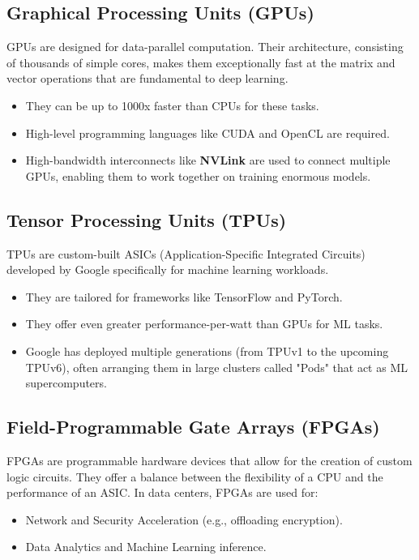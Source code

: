 \subsection{Graphical Processing Units (GPUs)}
GPUs are designed for data-parallel computation. Their architecture, consisting of thousands of simple cores, makes them exceptionally fast at the matrix and vector operations that are fundamental to deep learning.
\begin{itemize}
    \item They can be up to 1000x faster than CPUs for these tasks.
    \item High-level programming languages like CUDA and OpenCL are required.
    \item High-bandwidth interconnects like \textbf{NVLink} are used to connect multiple GPUs, enabling them to work together on training enormous models.
\end{itemize}

\subsection{Tensor Processing Units (TPUs)}
TPUs are custom-built ASICs (Application-Specific Integrated Circuits) developed by Google specifically for machine learning workloads.
\begin{itemize}
    \item They are tailored for frameworks like TensorFlow and PyTorch.
    \item They offer even greater performance-per-watt than GPUs for ML tasks.
    \item Google has deployed multiple generations (from TPUv1 to the upcoming TPUv6), often arranging them in large clusters called "Pods" that act as ML supercomputers.
\end{itemize}

\subsection{Field-Programmable Gate Arrays (FPGAs)}
FPGAs are programmable hardware devices that allow for the creation of custom logic circuits. They offer a balance between the flexibility of a CPU and the performance of an ASIC. In data centers, FPGAs are used for:
\begin{itemize}
    \item Network and Security Acceleration (e.g., offloading encryption).
    \item Data Analytics and Machine Learning inference.
\end{itemize}

